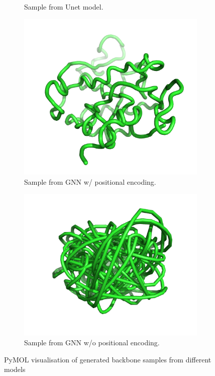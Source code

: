 \documentclass[a4paper,12pt]{article}
\begin{document}
\begin{figure}[htbp]
\begin{subfigure}[b]{0.495\textwidth}
        \caption{Sample from Unet model.}
        \label{fig:sample-unet}
    \end{subfigure}
    \begin{subfigure}[b]{0.495\textwidth}
        \centering
        \includegraphics[width=\linewidth]{1ak6A00_gen_pos.png}
        \caption{Sample from GNN w/ positional encoding.}
        \label{fig:sample-pos}
    \end{subfigure}
    \begin{subfigure}[b]{0.48\textwidth}
        \centering
        \includegraphics[width=\linewidth]{1a6fA00_gen_wo_pos.png}
        \caption{Sample from GNN w/o positional encoding.}
        \label{fig:sample-wo-pos}
    \end{subfigure}
    \caption{PyMOL visualisation of generated backbone samples from different models}
    \label{fig:samples}
\end{figure}
\end{document}
